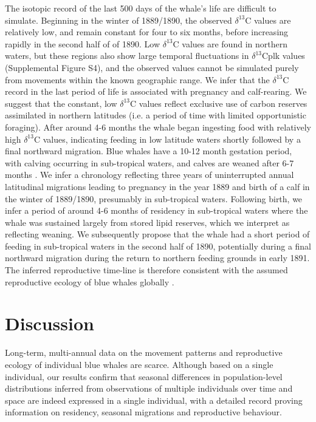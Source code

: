 \documentclass[a4paper,12pt]{article}
\begin{document}

The isotopic record of the last 500 days of the whale's life are difficult to simulate. 
Beginning in the winter of 1889/1890, the observed $\delta^{13}$C values are relatively low, and remain constant for four to six months, before increasing rapidly in the second half of of 1890. 
Low $\delta^{13}$C values are found in northern waters, but these regions also show large temporal fluctuations in $\delta^{13}$Cplk values (Supplemental Figure S4), and the observed values cannot be simulated purely from movements within the known geographic range.
We infer that the $\delta^{13}$C record in the last period of life is associated with pregnancy and calf-rearing. 
We suggest that the constant, low $\delta^{13}$C values reflect exclusive use of carbon reserves assimilated in northern latitudes (i.e. a period of time with limited opportunistic foraging). 
After around 4-6 months the whale began ingesting food with relatively high $\delta^{13}$C values, indicating feeding in low latitude waters shortly followed by a final northward migration. 
Blue whales have a 10-12 month gestation period, with calving occurring in sub-tropical waters, and calves are weaned after 6-7 months \cite{handbook}. 
We infer a chronology reflecting three years of uninterrupted annual latitudinal migrations leading to pregnancy in the year 1889 and birth of a calf in the winter of 1889/1890, presumably in sub-tropical waters.
Following birth, we infer a period of around 4-6 months of residency in sub-tropical waters where the whale was sustained largely from stored lipid reserves, which we interpret as reflecting weaning.
We subsequently propose that the whale had a short period of feeding in sub-tropical waters in the second half of 1890, potentially during a final northward migration during the return to northern feeding grounds in early 1891.
The inferred reproductive time-line is therefore consistent with the assumed reproductive ecology of blue whales globally \cite{handbook}. 

\section{Discussion}
Long-term, multi-annual data on the movement patterns and reproductive ecology of individual blue whales are scarce. 
Although based on a single individual, our results confirm that seasonal differences in population-level distributions inferred from observations of multiple individuals over time and space are indeed expressed in a single individual, with a detailed record proving information on residency, seasonal migrations and reproductive behaviour. 
\end{document}
